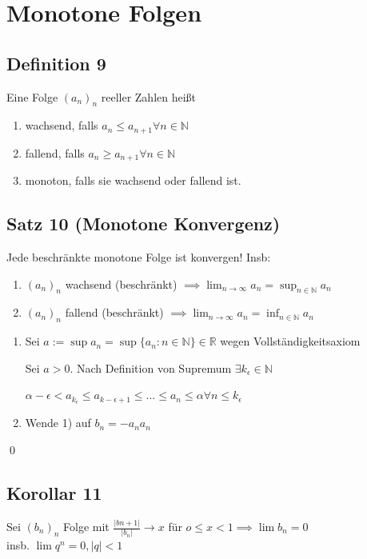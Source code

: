 \documentclass[fleqn]{scrbook}
\renewenvironment{proof}{{\bfseries Beweis }}{\qed}
\begin{document}
\section{Monotone Folgen}
\subsection{Definition 9} Eine Folge $(a_n)_n$ reeller Zahlen heißt
\begin{enumerate}[1)]
\item wachsend, falls $a_n \leq a_{n+1} \forall n \in \mathbb{N}$
\item fallend, falls $a_n \geq a_{n+1} \forall n \in \mathbb{N}$
\item monoton, falls sie wachsend oder fallend ist.
\end{enumerate}
\subsection{Satz 10 (Monotone Konvergenz)} Jede beschränkte monotone Folge ist konvergen! Insb:
\begin{enumerate}[1)]
\item $(a_n)_n$ wachsend (beschränkt) $\implies \lim_{n\rightarrow\infty} a_n = \sup_{n\in\mathbb{N}}a_n$
\item $(a_n)_n$ fallend (beschränkt) $\implies \lim_{n\rightarrow \infty} a_n = \inf_{n\in\mathbb{N}}a_n$
\end{enumerate}
\begin{proof}
\begin{enumerate}[1)]
\item Sei $a:=\sup a_n = \sup \{a_n: n\in\mathbb{N}\}\in\mathbb{R}$ wegen Vollständigkeitsaxiom

Sei $a>0$. Nach Definition von Supremum $\exists k_\epsilon \in \mathbb{N}$

$\alpha - \epsilon < a_{k_\epsilon} \leq a_{k-{\epsilon + 1}} \leq ... \leq a_n \leq \alpha \forall n \leq k_\epsilon$
\item Wende 1) auf $b_n = -a_n a_n$
\end{enumerate}
\end{proof}
\subsection{Korollar 11} Sei $(b_n)_n$ Folge mit $\frac{|b{n+1}|}{|b_n|} \rightarrow x$ für $o \leq x < 1 \implies \lim b_n = 0$\\insb. $\lim q^n = 0, |q|<1$
\end{document}

